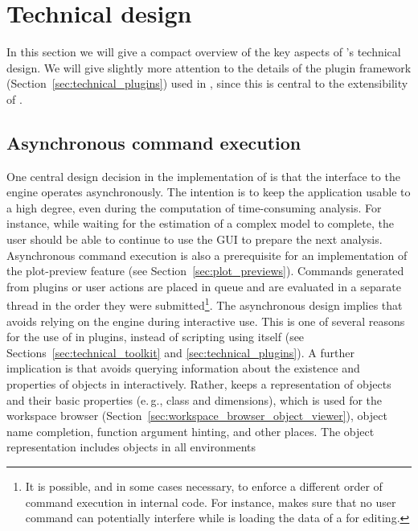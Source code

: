 \section{Technical design}
\label{sec:technical}
In this section we will give a compact overview of the key aspects of 's
technical design. We will give slightly more attention to the details of the
plugin framework (Section~\ref{sec:technical_plugins}) used in , since this is central to the extensibility of
.

\subsection{Asynchronous command execution}
\label{sec:technical_asynchronous}
One central design decision in the implementation of  is that the
interface to the  engine operates asynchronously. The intention is to
keep the application usable to a high degree, even during the computation of
time-consuming analysis. For instance, while waiting for the estimation of a
complex model to complete, the user should be able to continue to use the GUI to
prepare the next analysis. Asynchronous command execution is also a prerequisite
for an implementation of the plot-preview feature (see Section~\ref{sec:plot_previews}). Commands
generated from plugins or user actions are placed in queue and are evaluated in
a separate thread in the order they were submitted\footnote{
    It is possible, and in some cases necessary, to enforce a different order of command execution in
    internal code. For instance,  makes sure that no user command can
    potentially interfere while  is loading the data of a  for
    editing.
}. The asynchronous design implies that  avoids relying on the
 engine during interactive use. This is one of several reasons for
the use of  in plugins, instead of scripting using
 itself (see Sections~\ref{sec:technical_toolkit} and \ref{sec:technical_plugins}).
A further implication is that  avoids querying information about the
existence and properties of objects in  interactively. Rather,
 keeps a representation of  objects and their basic properties
(e.\,g., class and dimensions), which is used for the workspace browser (Section~\ref{sec:workspace_browser_object_viewer}),
object name completion, function argument hinting, and
other places. The object representation includes objects in all environments

